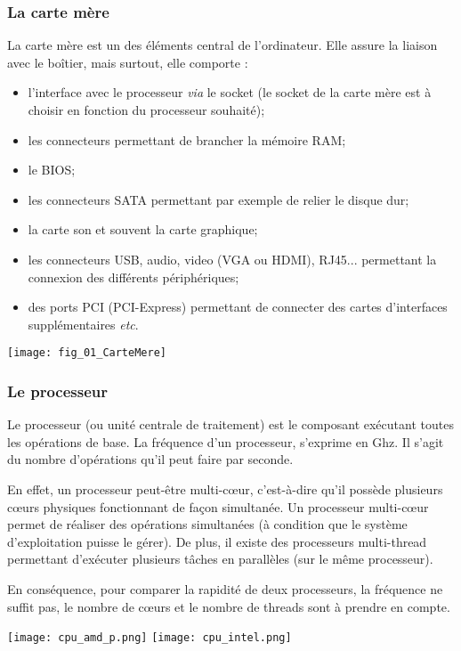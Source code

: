 \subsubsection{La carte mère}
\noindent
\begin{minipage}[c]{.49\linewidth}
\noindent La carte mère est un des éléments central de l'ordinateur. Elle assure la liaison avec le boîtier, mais surtout, elle comporte : 
\begin{itemize}
\item l'interface avec le processeur \textit{via} le socket (le socket de la carte mère est à choisir en fonction du processeur souhaité);
\item les connecteurs permettant de brancher la mémoire RAM;
\item le BIOS;
\item les connecteurs SATA permettant par exemple de relier le disque dur;
\item la carte son et souvent la carte graphique;
\item les connecteurs USB, audio, video (VGA ou HDMI), RJ45... permettant la connexion des différents périphériques;
\item des ports PCI (PCI-Express) permettant de connecter des cartes d'interfaces supplémentaires \textit{etc}.
\end{itemize}
\end{minipage} \hfill
\begin{minipage}[c]{.49\linewidth}
\begin{center}
\texttt{[image: fig\_01\_CarteMere]}
\end{center}
\end{minipage}

\subsubsection{Le processeur}
\begin{minipage}[c]{.65\linewidth}
Le processeur (ou unité centrale de traitement) est le composant exécutant toutes les opérations de base. La fréquence d'un processeur, s'exprime en Ghz. Il s'agit du nombre d'opérations qu'il peut faire par seconde.

En effet, un processeur peut-être multi-c\oe{}ur, c'est-à-dire qu'il possède plusieurs c\oe{}urs physiques fonctionnant de façon simultanée. Un processeur multi-c\oe{}ur permet de réaliser des opérations simultanées (à condition que le système d'exploitation puisse le gérer). 
De plus, il existe des processeurs multi-thread permettant d'exécuter plusieurs tâches en parallèles (sur le même processeur). 

En conséquence, pour comparer la rapidité de deux processeurs, la fréquence ne suffit pas, le nombre de cœurs et le nombre de threads sont à prendre en compte. 

\end{minipage}\hfill
\begin{minipage}[c]{.3\linewidth}
\begin{center}
\texttt{[image: cpu\_amd\_p.png]}
\texttt{[image: cpu\_intel.png]}
\end{center}
\end{minipage}
